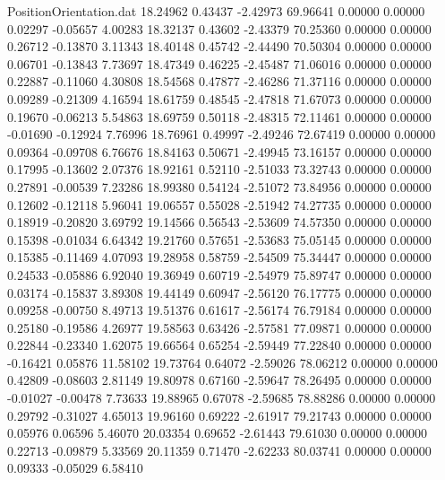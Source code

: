 \begin{filecontents}{PositionOrientation.dat}
  18.24962    0.43437   -2.42973    69.96641    0.00000    0.00000    0.02297   -0.05657    4.00283
  18.32137    0.43602   -2.43379    70.25360    0.00000    0.00000    0.26712   -0.13870    3.11343
  18.40148    0.45742   -2.44490    70.50304    0.00000    0.00000    0.06701   -0.13843    7.73697
  18.47349    0.46225   -2.45487    71.06016    0.00000    0.00000    0.22887   -0.11060    4.30808
  18.54568    0.47877   -2.46286    71.37116    0.00000    0.00000    0.09289   -0.21309    4.16594
  18.61759    0.48545   -2.47818    71.67073    0.00000    0.00000    0.19670   -0.06213    5.54863
  18.69759    0.50118   -2.48315    72.11461    0.00000    0.00000   -0.01690   -0.12924    7.76996
  18.76961    0.49997   -2.49246    72.67419    0.00000    0.00000    0.09364   -0.09708    6.76676
  18.84163    0.50671   -2.49945    73.16157    0.00000    0.00000    0.17995   -0.13602    2.07376
  18.92161    0.52110   -2.51033    73.32743    0.00000    0.00000    0.27891   -0.00539    7.23286
  18.99380    0.54124   -2.51072    73.84956    0.00000    0.00000    0.12602   -0.12118    5.96041
  19.06557    0.55028   -2.51942    74.27735    0.00000    0.00000    0.18919   -0.20820    3.69792
  19.14566    0.56543   -2.53609    74.57350    0.00000    0.00000    0.15398   -0.01034    6.64342
  19.21760    0.57651   -2.53683    75.05145    0.00000    0.00000    0.15385   -0.11469    4.07093
  19.28958    0.58759   -2.54509    75.34447    0.00000    0.00000    0.24533   -0.05886    6.92040
  19.36949    0.60719   -2.54979    75.89747    0.00000    0.00000    0.03174   -0.15837    3.89308
  19.44149    0.60947   -2.56120    76.17775    0.00000    0.00000    0.09258   -0.00750    8.49713
  19.51376    0.61617   -2.56174    76.79184    0.00000    0.00000    0.25180   -0.19586    4.26977
  19.58563    0.63426   -2.57581    77.09871    0.00000    0.00000    0.22844   -0.23340    1.62075
  19.66564    0.65254   -2.59449    77.22840    0.00000    0.00000   -0.16421    0.05876   11.58102
  19.73764    0.64072   -2.59026    78.06212    0.00000    0.00000    0.42809   -0.08603    2.81149
  19.80978    0.67160   -2.59647    78.26495    0.00000    0.00000   -0.01027   -0.00478    7.73633
  19.88965    0.67078   -2.59685    78.88286    0.00000    0.00000    0.29792   -0.31027    4.65013
  19.96160    0.69222   -2.61917    79.21743    0.00000    0.00000    0.05976    0.06596    5.46070
  20.03354    0.69652   -2.61443    79.61030    0.00000    0.00000    0.22713   -0.09879    5.33569
  20.11359    0.71470   -2.62233    80.03741    0.00000    0.00000    0.09333   -0.05029    6.58410

\end{filecontents}
